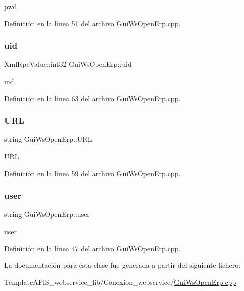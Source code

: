 pwd 



Definición en la línea 51 del archivo Gui\+Ws\+Open\+Erp.\+cpp.

\hypertarget{classGuiWsOpenErp_a791f1dd8b0b16f454ae7f1a2abe0a761}{}\label{classGuiWsOpenErp_a791f1dd8b0b16f454ae7f1a2abe0a761} 
\subsubsection{\texorpdfstring{uid}{uid}}
{\footnotesize\ttfamily Xml\+Rpc\+Value\+::int32 Gui\+Ws\+Open\+Erp\+::uid\hspace{0.3cm}{\ttfamily [private]}}



uid 



Definición en la línea 63 del archivo Gui\+Ws\+Open\+Erp.\+cpp.

\hypertarget{classGuiWsOpenErp_a96c46b5aed53de6d0fca055f28862be5}{}\label{classGuiWsOpenErp_a96c46b5aed53de6d0fca055f28862be5} 
\subsubsection{\texorpdfstring{U\+RL}{URL}}
{\footnotesize\ttfamily string Gui\+Ws\+Open\+Erp\+::\+U\+RL\hspace{0.3cm}{\ttfamily [private]}}



U\+RL. 



Definición en la línea 59 del archivo Gui\+Ws\+Open\+Erp.\+cpp.

\hypertarget{classGuiWsOpenErp_a34037b0900d58859cc4c42e77f170d82}{}\label{classGuiWsOpenErp_a34037b0900d58859cc4c42e77f170d82} 
\subsubsection{\texorpdfstring{user}{user}}
{\footnotesize\ttfamily string Gui\+Ws\+Open\+Erp\+::user\hspace{0.3cm}{\ttfamily [private]}}



user 



Definición en la línea 47 del archivo Gui\+Ws\+Open\+Erp.\+cpp.



La documentación para esta clase fue generada a partir del siguiente fichero\+:\begin{DoxyCompactItemize}
\item 
Template\+A\+F\+I\+S\+\_\+webservice\+\_\+lib/\+Conexion\+\_\+webservice/\hyperlink{GuiWsOpenErp_8cpp}{Gui\+Ws\+Open\+Erp.\+cpp}\end{DoxyCompactItemize}
